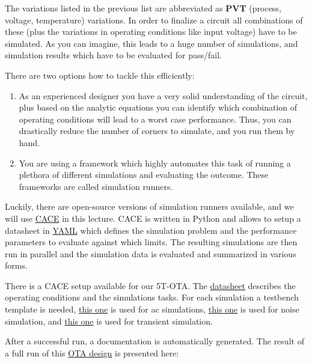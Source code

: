 \documentclass[
  a4paper,
  DIV=11,
  numbers=noendperiod]{scrartcl}
\providecommand{\tightlist}{%
  \setlength{\itemsep}{0pt}\setlength{\parskip}{0pt}}\usepackage{longtable,booktabs,array}
\begin{document}
The variations listed in the previous list are abbreviated as
\textbf{PVT} (process, voltage, temperature) variations. In order to
finalize a circuit all combinations of these (plus the variations in
operating conditions like input voltage) have to be simulated. As you
can imagine, this leads to a huge number of simulations, and simulation
results which have to be evaluated for pass/fail.

There are two options how to tackle this efficiently:

\begin{enumerate}
\def\labelenumi{\arabic{enumi}.}
\tightlist
\item
  As an experienced designer you have a very solid understanding of the
  circuit, plus based on the analytic equations you can identify which
  combination of operating conditions will lead to a worst case
  performance. Thus, you can drastically reduce the number of corners to
  simulate, and you run them by hand.
\item
  You are using a framework which highly automates this task of running
  a plethora of different simulations and evaluating the outcome. These
  frameworks are called simulation runners.
\end{enumerate}

Luckily, there are open-source versions of simulation runners available,
and we will use \href{https://github.com/efabless/cace}{CACE} in this
lecture. CACE is written in Python and allows to setup a datasheet in
\href{https://yaml.org}{YAML} which defines the simulation problem and
the performance parameters to evaluate against which limits. The
resulting simulations are then run in parallel and the simulation data
is evaluated and summarized in various forms.

There is a CACE setup available for our 5T-OTA. The
\href{./cace/voltage-buffer-ota.yaml}{datasheet} describes the operating
conditions and the simulations tasks. For each simulation a testbench
template is needed, \href{./cace/templates/ota-5t-ac.sch}{this one} is
used for ac simulations, \href{./cace/templates/ota-5t-noise.sch}{this
one} is used for noise simulation, and
\href{./cace/templates/ota-5t-tran.sch}{this one} is used for transient
simulation.

After a successful run, a documentation is automatically generated. The
result of a full run of this \href{./xschem/ota-5t.svg}{OTA design} is
presented here:
\end{document}

